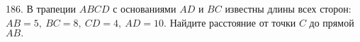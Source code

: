 186. В трапеции $ABCD$ с основаниями $AD$ и $BC$ известны длины всех сторон: $AB=5,\ BC=8,\ CD=4,\ AD=10.$ Найдите расстояние от точки $C$ до прямой $AB.$\\
